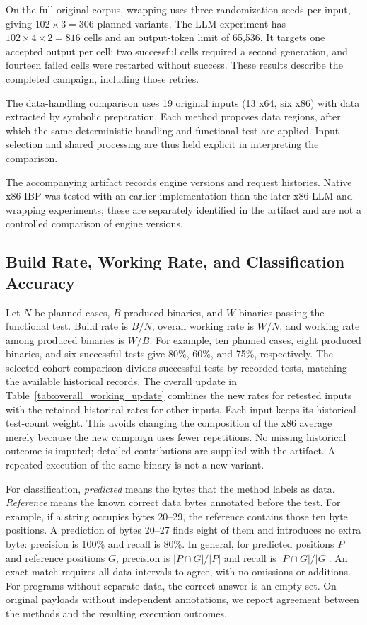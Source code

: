 On the full original corpus, wrapping uses three randomization seeds per
input, giving $102\times3=306$ planned variants. The LLM experiment has
$102\times4\times2=816$ cells and an output-token limit of 65,536.
It targets one accepted output per cell; two successful cells required a
second generation, and fourteen failed cells were restarted without success.
These results describe the completed campaign, including those retries.

The data-handling comparison uses 19 original inputs (13 x64,
six x86) with data extracted by symbolic preparation. Each method proposes
data regions, after which the same deterministic handling and functional
test are applied. Input selection and shared processing are thus held
explicit in interpreting the comparison.

The accompanying artifact records engine versions and request histories.
Native x86 IBP was tested with an earlier implementation than the later
x86 LLM and wrapping experiments; these are separately identified in the
artifact and are not a controlled comparison of engine versions.

\subsection{Build Rate, Working Rate, and Classification Accuracy}
Let $N$ be planned cases, $B$ produced binaries, and $W$ binaries passing
the functional test. Build rate is $B/N$, overall working rate is $W/N$,
and working rate among produced binaries is $W/B$.
For example, ten planned cases, eight produced binaries, and six successful
tests give 80\%, 60\%, and 75\%, respectively. The selected-cohort comparison divides
successful tests by recorded tests, matching the available historical
records. The overall update in Table~\ref{tab:overall_working_update}
combines the new rates for retested inputs with the retained historical
rates for other inputs. Each input keeps its historical test-count weight.
This avoids changing the composition of the x86 average merely because
the new campaign uses fewer repetitions. No missing historical outcome is
imputed; detailed contributions are supplied with the artifact. A repeated execution of the same binary is not a new variant.

For classification, \emph{predicted} means the bytes that the method labels
as data. \emph{Reference} means the known correct data bytes annotated
before the test. For example, if a string occupies bytes 20--29, the
reference contains those ten byte positions. A prediction of bytes 20--27
finds eight of them and introduces no extra byte: precision is 100\%
and recall is 80\%. In general, for predicted positions $P$ and reference
positions $G$, precision is $|P\cap G|/|P|$ and recall is $|P\cap G|/|G|$.
An exact match requires all data intervals to agree, with no omissions or
additions. For programs without separate data, the correct answer is an
empty set. On original payloads without independent annotations, we report
agreement between the methods and the resulting execution outcomes.

